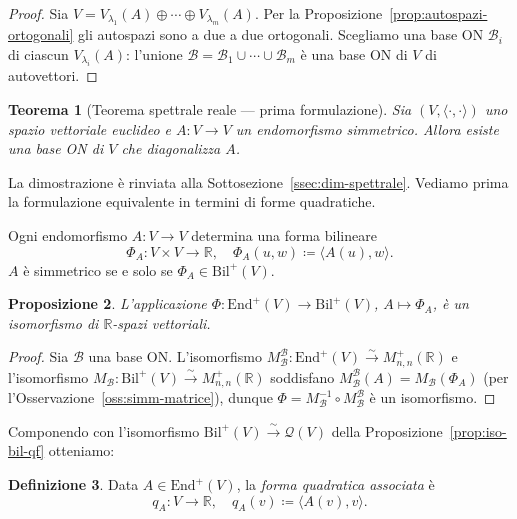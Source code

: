 \documentclass[11pt, a4paper]{book}
\theoremstyle{definition}
\newtheorem{definizione}{Definizione}[section]
\theoremstyle{plain}
\newtheorem{teorema}[definizione]{Teorema}
\newtheorem{proposizione}[definizione]{Proposizione}
\theoremstyle{remark}
\newcommand{\R}{\mathbb{R}}
\begin{document}
\begin{proof}
Sia $V = V_{\lambda_1}(A) \oplus \cdots \oplus V_{\lambda_m}(A)$. Per la Proposizione~\ref{prop:autospazi-ortogonali} gli autospazi sono a due a due ortogonali. Scegliamo una base ON $\mathcal{B}_i$ di ciascun $V_{\lambda_i}(A)$: l'unione $\mathcal{B} = \mathcal{B}_1 \cup \cdots \cup \mathcal{B}_m$ è una base ON di $V$ di autovettori.
\end{proof}

\begin{teorema}[Teorema spettrale reale --- prima formulazione]
\label{thm:spettrale-reale-I}
Sia $(V,\langle\cdot,\cdot\rangle)$ uno spazio vettoriale euclideo e $A \colon V \to V$ un endomorfismo simmetrico. Allora esiste una base ON di $V$ che diagonalizza $A$.
\end{teorema}

La dimostrazione è rinviata alla Sottosezione~\ref{ssec:dim-spettrale}. Vediamo prima la formulazione equivalente in termini di forme quadratiche.

Ogni endomorfismo $A \colon V \to V$ determina una forma bilineare
\[
  \Phi_A \colon V \times V \to \R, \quad \Phi_A(u,w) \coloneqq \langle A(u),w\rangle.
\]
$A$ è simmetrico se e solo se $\Phi_A \in \mathrm{Bil}^+(V)$.

\begin{proposizione}
\label{prop:iso-end-bil}
L'applicazione $\Phi \colon \mathrm{End}^+(V) \to \mathrm{Bil}^+(V)$, $A \mapsto \Phi_A$, è un isomorfismo di $\R$-spazi vettoriali.
\end{proposizione}

\begin{proof}
Sia $\mathcal{B}$ una base ON. L'isomorfismo $M^\mathcal{B}_\mathcal{B} \colon \mathrm{End}^+(V) \xrightarrow{\sim} M^+_{n,n}(\R)$ e l'isomorfismo $M_\mathcal{B} \colon \mathrm{Bil}^+(V) \xrightarrow{\sim} M^+_{n,n}(\R)$ soddisfano $M^\mathcal{B}_\mathcal{B}(A) = M_\mathcal{B}(\Phi_A)$ (per l'Osservazione~\ref{oss:simm-matrice}), dunque $\Phi = M_\mathcal{B}^{-1} \circ M^\mathcal{B}_\mathcal{B}$ è un isomorfismo.
\end{proof}

Componendo con l'isomorfismo $\mathrm{Bil}^+(V) \xrightarrow{\sim} \mathcal{Q}(V)$ della Proposizione~\ref{prop:iso-bil-qf} otteniamo:

\begin{defbox}
\begin{definizione}
Data $A \in \mathrm{End}^+(V)$, la \emph{forma quadratica associata} è
\[
  q_A \colon V \to \R, \quad q_A(v) \coloneqq \langle A(v),v\rangle.
\]
\end{definizione}
\end{defbox}
\end{document}
